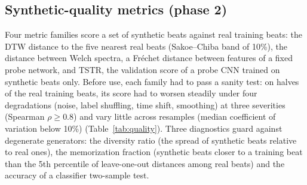 \documentclass[11pt]{article}
\begin{document}
\subsection{Synthetic-quality metrics (phase 2)}
Four metric families score a set of synthetic beats against real training beats: the DTW distance to the five nearest real beats
(Sakoe--Chiba band of 10\%), the distance between Welch spectra, a Fr\'echet distance between features of a fixed probe network, and
TSTR, the validation score of a probe CNN trained on synthetic beats only. Before use, each family had to pass a sanity test: on halves of
the real training beats, its score had to worsen steadily under four degradations (noise, label shuffling, time shift, smoothing) at three
severities (Spearman $\rho \ge 0.8$) and vary little across resamples (median coefficient of variation below 10\%)
(Table~\ref{tab:quality}). Three diagnostics guard against degenerate generators: the diversity ratio (the spread of synthetic beats
relative to real ones), the memorization fraction (synthetic beats closer to a training beat than the 5th percentile of leave-one-out
distances among real beats) and the accuracy of a classifier two-sample test.
\begin{table}[htbp]\centering\small{}\caption{Sanity
tests of the quality metrics.}\label{tab:quality}\end{table}
\end{document}
